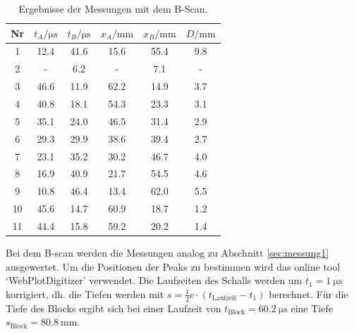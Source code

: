 \begin{table}[h]
    \centering
    \begin{tabular}{S S[table-format=:.1] S[table-format=:.1] S S S}
        \toprule
        {Nr}& {$t_A/\unit{\micro\second}$} & {$t_B/\unit{\micro\second}$} & {$x_A/\unit{\mm}$} & {$x_B/\unit{\mm}$} & {$D/\unit{\mm}$}\\
               & 12.4  & 41.6  & 15.6  & 55.4  & 9.8   \\
        2       & {-}   & 6.2   & {-}   & 7.1   & {-}   \\
        3       & 46.6  & 11.9  & 62.2  & 14.9  & 3.7   \\
        4       & 40.8  & 18.1  & 54.3  & 23.3  & 3.1   \\
        5       & 35.1  & 24.0  & 46.5  & 31.4  & 2.9   \\
        6       & 29.3  & 29.9  & 38.6  & 39.4  & 2.7   \\
        7       & 23.1  & 35.2  & 30.2  & 46.7  & 4.0   \\
        8       & 16.9  & 40.9  & 21.7  & 54.5  & 4.6   \\
        9       & 10.8  & 46.4  & 13.4  & 62.0  & 5.5   \\
        10      & 45.6  & 14.7  & 60.9  & 18.7  & 1.2   \\
        11      & 44.4  & 15.8  & 59.2  & 20.2  & 1.4   \\
    \end{tabular}
    \caption{Ergebnisse der Messungen mit dem B-Scan.}
    \label{tab:b-scan}
\end{table}

Bei dem B-scan werden die Messungen analog zu Abschnitt \ref{sec:messung1} ausgewertet.
Um die Positionen der Peaks zu bestimmen wird das online tool \enquote*{WebPlotDigitizer} \cite{webplot} verwendet.
Die Laufzeiten des Schalls werden um $t_1 = \qty{1}{\micro\s}$ korrigiert, dh. die Tiefen werden mit
$s = \frac{1}{2} c \cdot (t_\text{Laufzeit} - t_1)$
berechnet.
Für die Tiefe des Blocks ergibt sich bei einer Laufzeit von $t_\text{Block}= \qty{60.2}{\micro\s}$ eine Tiefe 
$s_\text{Block}= \qty{80.8}{\mm}$.
   
